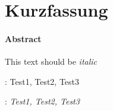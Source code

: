 %
%

\chapter*{Kurzfassung}
\thispagestyle{empty}

\subsubsection*{Abstract}
This text should be \textit{italic}
\vspace{8\baselineskip}

{\normalsize
{}:  Test1, Test2, Test3

:  \textit{Test1, Test2, Test3}
}

